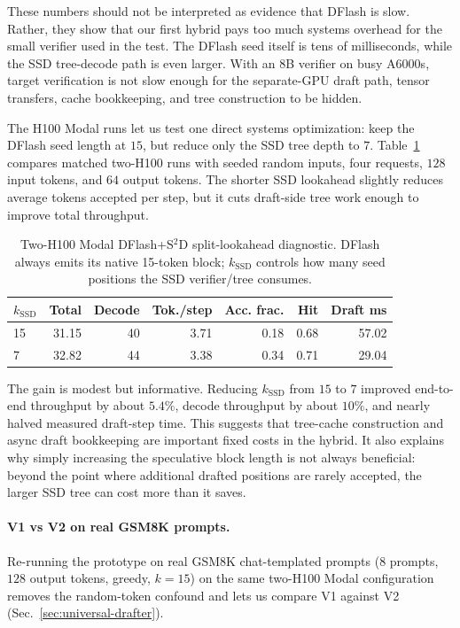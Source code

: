 These numbers should not be interpreted as evidence that DFlash is slow.
Rather, they show that our first hybrid pays too much systems overhead for the
small verifier used in the test. The DFlash seed itself is tens of
milliseconds, while the SSD tree-decode path is even larger. With an 8B
verifier on busy A6000s, target verification is not slow enough for the
separate-GPU draft path, tensor transfers, cache bookkeeping, and tree
construction to be hidden.

The H100 Modal runs let us test one direct systems optimization: keep the
DFlash seed length at $15$, but reduce only the SSD tree depth to $7$.
Table~\ref{tab:split-k} compares matched two-H100 runs with seeded random
inputs, four requests, $128$ input tokens, and $64$ output tokens. The shorter
SSD lookahead slightly reduces average tokens accepted per step, but it cuts
draft-side tree work enough to improve total throughput.

\begin{table}[t]
  \caption{Two-H100 Modal DFlash+S$^2$D split-lookahead diagnostic. DFlash
  always emits its native 15-token block; $k_{\mathrm{SSD}}$ controls how many
  seed positions the SSD verifier/tree consumes.}
  \label{tab:split-k}
  \centering
  \scriptsize
  \begin{tabular}{@{}lrrrrrr@{}}
    \toprule
    $k_{\mathrm{SSD}}$ & Total & Decode & Tok./step & Acc. frac. & Hit & Draft ms \\
    \midrule
    15 & 31.15 & 40 & 3.71 & 0.18 & 0.68 & 57.02 \\
     7 & 32.82 & 44 & 3.38 & 0.34 & 0.71 & 29.04 \\
    \bottomrule
  \end{tabular}
\end{table}

The gain is modest but informative. Reducing $k_{\mathrm{SSD}}$ from $15$ to
$7$ improved end-to-end throughput by about $5.4\%$, decode throughput by
about $10\%$, and nearly halved measured draft-step time. This suggests that
tree-cache construction and async draft bookkeeping are important fixed costs
in the hybrid. It also explains why simply increasing the speculative block
length is not always beneficial: beyond the point where additional drafted
positions are rarely accepted, the larger SSD tree can cost more than it
saves.

\paragraph{V1 vs V2 on real GSM8K prompts.}
Re-running the prototype on real GSM8K chat-templated prompts ($8$ prompts,
$128$ output tokens, greedy, $k{=}15$) on the same two-H100 Modal
configuration removes the random-token confound and lets us compare V1
against V2 (Sec.~\ref{sec:universal-drafter}).

